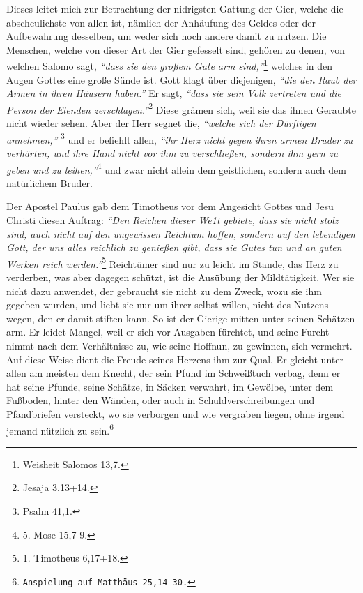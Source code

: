 Dieses leitet mich zur Betrachtung der nidrigsten Gattung der Gier, welche die
abscheulichste von allen ist, nämlich der Anhäufung des Geldes oder der
Aufbewahrung desselben, um weder sich noch andere damit zu nutzen.
Die Menschen,
welche von dieser Art der Gier gefesselt sind, gehören zu denen, von welchen
Salomo sagt,
\textit{"`dass sie den großem Gute arm sind,"'}\footnote{Weisheit Salomos 13,7.}
welches in den Augen Gottes eine große Sünde ist. Gott klagt
über diejenigen,
\textit{"`die den Raub der Armen in ihren Häusern haben."'} Er sagt,
\textit{"`dass sie sein Volk
zertreten und die Person der Elenden zerschlagen."'}\footnote{Jesaja 3,13+14.}
Diese grämen sich, weil sie das ihnen Geraubte nicht wieder sehen. Aber der Herr
segnet die, \textit{"`welche sich der Dürftigen annehmen,"'}
\footnote{Psalm 41,1.}
und er
befiehlt allen,
\textit{"`ihr Herz nicht gegen ihren armen Bruder zu verhärten, und ihre
Hand nicht vor ihm zu verschließen, sondern ihm gern zu geben und zu
leihen,"'}\footnote{5. Mose 15,7-9.}
und zwar nicht allein dem geistlichen,
sondern auch dem natürlichem Bruder.

\medskip

Der Apostel Paulus gab dem Timotheus vor dem Angesicht Gottes und Jesu Christi
diesen Auftrag:
\textit{"`Den Reichen dieser We1t gebiete, dass sie nicht stolz sind,
auch nicht auf den ungewissen Reichtum hoffen, sondern auf den lebendigen Gott,
der uns alles reichlich zu genießen gibt, dass sie Gutes tun und an guten
Werken reich werden."'}\footnote{1. Timotheus 6,17+18.}
Reichtümer sind nur zu leicht
im Stande, das Herz zu verderben, was aber
dagegen schützt, ist die Ausübung der
Mildtätigkeit. Wer sie nicht dazu anwendet, der gebraucht
sie nicht zu dem
Zweck, wozu sie ihm gegeben wurden, und liebt sie nur um ihrer selbst willen,
nicht des Nutzens wegen, den er damit stiften kann. So
ist der Gierige mitten
unter seinen Schätzen arm. Er leidet Mangel, weil er sich vor Ausgaben fürchtet,
und seine Furcht nimmt nach dem Verhältnisse zu, wie
seine Hoffnun, zu gewinnen,
sich vermehrt. Auf diese Weise dient die Freude seines Herzens ihm zur Qual. Er
gleicht unter allen am meisten dem Knecht, der sein Pfund im Schweißtuch
verbag, denn er hat seine Pfunde, seine Schätze, in Säcken verwahrt, im Gewölbe,
unter dem Fußboden, hinter den Wänden, oder auch in Schuldverschreibungen und
Pfandbriefen versteckt, wo sie verborgen und wie vergraben liegen, ohne irgend
jemand nützlich zu sein.\footnote{\texttt{Anspielung auf Matthäus 25,14-30.}}

